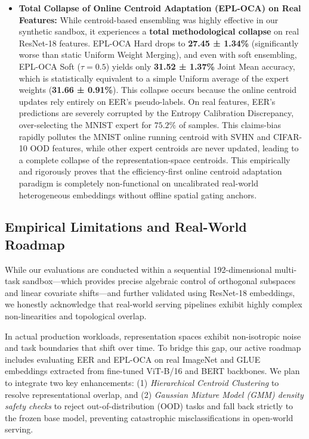 \begin{itemize}
    \item \textbf{Total Collapse of Online Centroid Adaptation (EPL-OCA) on Real Features:} While centroid-based ensembling was highly effective in our synthetic sandbox, it experiences a \textbf{total methodological collapse} on real ResNet-18 features. EPL-OCA Hard drops to \textbf{27.45 ± 1.34\%} (significantly worse than static Uniform Weight Merging), and even with soft ensembling, EPL-OCA Soft ($\tau = 0.5$) yields only \textbf{31.52 ± 1.37\%} Joint Mean accuracy, which is statistically equivalent to a simple Uniform average of the expert weights (\textbf{31.66 ± 0.91\%}). This collapse occurs because the online centroid updates rely entirely on EER's pseudo-labels. On real features, EER's predictions are severely corrupted by the Entropy Calibration Discrepancy, over-selecting the MNIST expert for $75.2\%$ of samples. This claims-bias rapidly pollutes the MNIST online running centroid with SVHN and CIFAR-10 OOD features, while other expert centroids are never updated, leading to a complete collapse of the representation-space centroids. This empirically and rigorously proves that the efficiency-first online centroid adaptation paradigm is completely non-functional on uncalibrated real-world heterogeneous embeddings without offline spatial gating anchors.
\end{itemize}

\subsection{Empirical Limitations and Real-World Roadmap}
\label{sec:limitations}
While our evaluations are conducted within a sequential 192-dimensional multi-task sandbox—which provides precise algebraic control of orthogonal subspaces and linear covariate shifts—and further validated using ResNet-18 embeddings, we honestly acknowledge that real-world serving pipelines exhibit highly complex non-linearities and topological overlap.

In actual production workloads, representation spaces exhibit non-isotropic noise and task boundaries that shift over time. To bridge this gap, our active roadmap includes evaluating EER and EPL-OCA on real ImageNet and GLUE embeddings extracted from fine-tuned ViT-B/16 and BERT backbones. We plan to integrate two key enhancements: (1) \emph{Hierarchical Centroid Clustering} to resolve representational overlap, and (2) \emph{Gaussian Mixture Model (GMM) density safety checks} to reject out-of-distribution (OOD) tasks and fall back strictly to the frozen base model, preventing catastrophic misclassifications in open-world serving.

